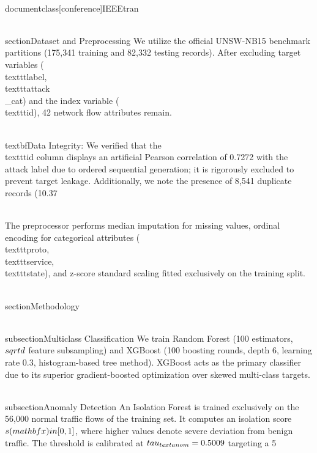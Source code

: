 \\documentclass[conference]{IEEEtran}
\begin{document}
\\section{Dataset and Preprocessing}
We utilize the official UNSW-NB15 benchmark partitions (175,341 training and 82,332 testing records). After excluding target variables (\\texttt{label}, \\texttt{attack\\_cat}) and the index variable (\\texttt{id}), 42 network flow attributes remain. 

\\textbf{Data Integrity:} We verified that the \\texttt{id} column displays an artificial Pearson correlation of 0.7272 with the attack label due to ordered sequential generation; it is rigorously excluded to prevent target leakage. Additionally, we note the presence of 8,541 duplicate records (10.37\\%

\

The preprocessor performs median imputation for missing values, ordinal encoding for categorical attributes (\\texttt{proto}, \\texttt{service}, \\texttt{state}), and z-score standard scaling fitted exclusively on the training split.

\\section{Methodology}

\\subsection{Multiclass Classification}
We train Random Forest (100 estimators, $\\sqrt{d}$ feature subsampling) and XGBoost (100 boosting rounds, depth 6, learning rate 0.3, histogram-based tree method). XGBoost acts as the primary classifier due to its superior gradient-boosted optimization over skewed multi-class targets.

\\subsection{Anomaly Detection}
An Isolation Forest is trained exclusively on the 56,000 normal traffic flows of the training set. It computes an isolation score $s(\\mathbf{x}) \\in [0, 1]$, where higher values denote severe deviation from benign traffic. The threshold is calibrated at $\\tau_{\\text{anom}} = 0.5009$ targeting a 5\\%
\end{document}
